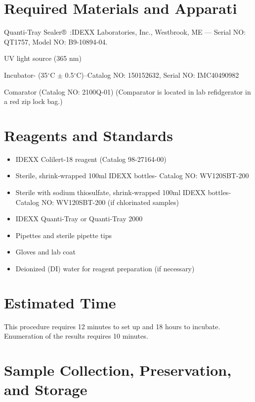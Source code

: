 \documentclass[12pt]{../SOP4_alpha}\usepackage[]{graphicx}\usepackage[]{xcolor}
\begin{document}
\section{Required Materials and Apparati}

\NP Quanti-Tray Sealer®\textregistered ~:IDEXX Laboratories, Inc., Westbrook, ME --- Serial NO: QT1757, Model NO: B9-10894-04.

\NP UV light source (365 nm)

\NP Incubator- (35$^{\circ}$C $\pm$ 0.5$^{\circ}$C)--Catalog NO: 150152632, Serial NO: IMC40490982

\NP Comarator (Catalog NO: 2100Q-01) (Comparator is located in lab refidgerator in a red zip lock bag.)

\section{Reagents and Standards}

\begin{itemize}

\item IDEXX Colilert-18 reagent (Catalog 98-27164-00)

\item Sterile, shrink-wrapped 100ml IDEXX bottles- Catalog NO: WV120SBT-200 

\item Sterile with sodium thiosulfate, shrink-wrapped 100ml IDEXX bottles- Catalog NO: WV120SBT-200 (if chlorinated samples)

\item IDEXX Quanti-Tray or Quanti-Tray 2000
\item Pipettes and sterile pipette tips

\item Gloves and lab coat

\item Deionized (DI) water for reagent preparation (if necessary)

\end{itemize}

\section{Estimated Time}

\NP This procedure requires 12 minutes to set up and 18 hours to incubate. Enumeration of the results requires 10 minutes.

\section{Sample Collection, Preservation, and Storage}
\end{document}
